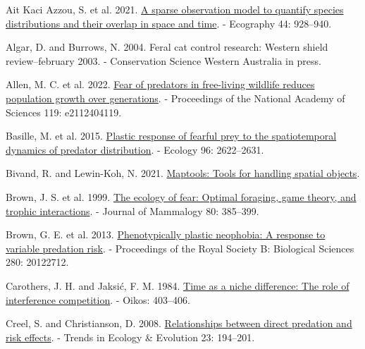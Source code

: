 \documentclass[preprint, 3p, authoryear]{elsarticle} %
\newlength{\cslhangindent}
\newlength{\cslentryspacingunit} %
\newenvironment{CSLReferences}[2] %
 {%
  \setlength{\parindent}{0pt}
  \ifodd #1
  \let\oldpar\par
  \def\par{\hangindent=\cslhangindent\oldpar}
  \fi
  \setlength{\parskip}{#2\cslentryspacingunit}
 }%
 {}
\begin{document}
\hypertarget{refs}{}
\begin{CSLReferences}{1}{0}
\leavevmode{}%
Ait Kaci Azzou, S. et al. 2021. \href{https://doi.org/10.1111/ecog.05411}{A sparse observation model to quantify species distributions and their overlap in space and time}. - Ecography 44: 928--940.

\leavevmode{}%
Algar, D. and Burrows, N. 2004. Feral cat control research: Western shield review--february 2003. - Conservation Science Western Australia in press.

\leavevmode{}%
Allen, M. C. et al. 2022. \href{https://doi.org/10.1073/pnas.2112404119}{Fear of predators in free-living wildlife reduces population growth over generations}. - Proceedings of the National Academy of Sciences 119: e2112404119.

\leavevmode{}%
Basille, M. et al. 2015. \href{https://doi.org/10.1890/14-1706.1}{Plastic response of fearful prey to the spatiotemporal dynamics of predator distribution}. - Ecology 96: 2622--2631.

\leavevmode{}%
Bivand, R. and Lewin-Koh, N. 2021. \href{https://CRAN.R-project.org/package=maptools}{Maptools: Tools for handling spatial objects}.

\leavevmode{}%
Brown, J. S. et al. 1999. \href{https://doi.org/10.2307/1383287}{The ecology of fear: Optimal foraging, game theory, and trophic interactions}. - Journal of Mammalogy 80: 385--399.

\leavevmode{}%
Brown, G. E. et al. 2013. \href{https://doi.org/10.1098/rspb.2012.2712}{Phenotypically plastic neophobia: A response to variable predation risk}. - Proceedings of the Royal Society B: Biological Sciences 280: 20122712.

\leavevmode{}%
Carothers, J. H. and Jaksić, F. M. 1984. \href{https://doi.org/10.2307/3544413}{Time as a niche difference: The role of interference competition}. - Oikos: 403--406.

\leavevmode{}%
Creel, S. and Christianson, D. 2008. \href{https://doi.org/10.1016/j.tree.2007.12.004}{Relationships between direct predation and risk effects}. - Trends in Ecology \& Evolution 23: 194--201.


\end{CSLReferences}
\end{document}
